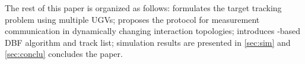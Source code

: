 	
	The rest of this paper is organized as follows: 
	 formulates the target tracking problem using multiple UGVs;
	 proposes the {\proto} protocol for measurement communication in dynamically changing interaction topologies;
	 introduces \proto-based DBF algorithm and track list;
	simulation results are presented in \cref{sec:sim} and \cref{sec:conclu} concludes the paper.